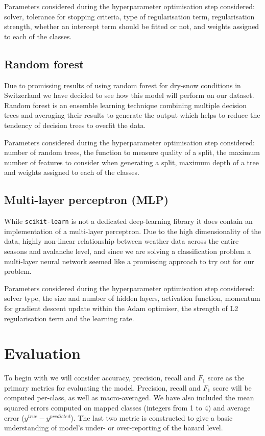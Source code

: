 \documentclass{article}
\begin{document}
	Parameters considered during the hyperparameter optimisation step considered: solver, tolerance for stopping criteria, type of regularisation term, regularisation strength, whether an intercept term should be fitted or not, and weights assigned to each of the classes.

\subsection{Random forest}
	Due to promissing results of \cite{nhess-22-2031-2022} using random forest for dry-snow conditions in Switzerland we have decided to see how this model will perform on our dataset. Random forest is an ensemble learning technique combining multiple decision trees and averaging their results to generate the output which helps to reduce the tendency of decision trees to overfit the data.

	Parameters considered during the hyperparameter optimisation step considered: number of random trees, the function to measure quality of a split, the maximum number of features to consider when generating a split, maximum depth of a tree and weights assigned to each of the classes.

\subsection{Multi-layer perceptron (MLP)}
	While \texttt{scikit-learn} is not a dedicated deep-learning library it does contain an implementation of a multi-layer perceptron. Due to the high dimensionality of the data, highly non-linear relationship between weather data across the entire seasons and avalanche level, and since we are solving a classification problem a multi-layer neural network seemed like a promissing approach to try out for our problem.

	Parameters considered during the hyperparameter optimisation step considered: solver type, the size and number of hidden layers, activation function, momentum for gradient descent update within the Adam optimiser, the strength of L2 regularisation term and the learning rate.

\section{Evaluation}\label{sec:evaluation}

To begin with we will consider accuracy, precision, recall and $F_1$ score as the primary metrics for evaluating the model. Precision, recall and $F_1$ score will be computed per-class, as well as macro-averaged.
\newline
We have also included the mean squared errors computed on mapped classes (integers from 1 to 4) and average error ($y^{true} - y^{predicted}$). The last two metric is constructed to give a basic understanding of model's under- or over-reporting of the hazard level.
\end{document}

